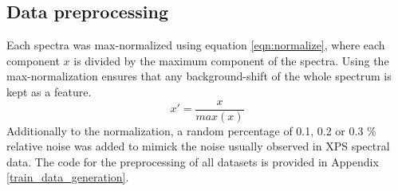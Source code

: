 \subsection{Data preprocessing}

Each spectra was max-normalized using equation \ref{eqn:normalize}, where each component $x$ is divided by the maximum component of the spectra. Using the max-normalization ensures that any background-shift of the whole spectrum is kept as a feature.
\begin{equation}
    x' = \frac{x}{max(x)}
\label{eqn:normalize}
\end{equation}
Additionally to the normalization, a random percentage of 0.1, 0.2 or 0.3 \% relative noise was added to mimick the noise usually observed in XPS spectral data. The code for the preprocessing of all datasets is provided in Appendix \ref{train_data_generation}.